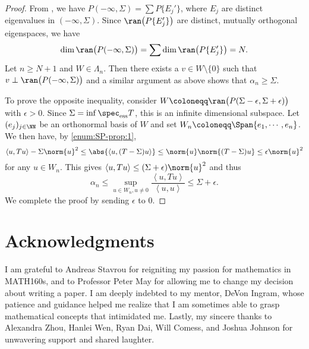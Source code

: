 \documentclass[oneside,reqno,letterpaper]{amsart}
\newcommand{\essspec}{\spec_{\text{ess}}}
\begin{document}
\begin{proof}
  From , we have \(P(-\infty, \Sigma) = \sum P \{E_j'\}\), where \(E_j\) are distinct eigenvalues in \((-\infty, \Sigma)\). 
  Since \(\ran\big(P \{E_j'\} \big)\) are distinct, mutually orthogonal eigenspaces, we have 
  \[
    \dim \ran\big(P(-\infty, \Sigma)\big)
    = \sum \dim \ran\big(P\{E_j'\}\big)
    = N .
  \] 
  Let \(n \geq N + 1\) and \(W \in \Lambda_{n}\). 
  Then there exists a \(v \in W \setminus \{0\}\) such that \(v \perp \ran\big(P(-\infty, \Sigma)\big)\) and a similar argument as above shows that \(\alpha_n \geq \Sigma\). 

  To prove the opposite inequality, consider \(W \coloneqq \ran\big(P(\Sigma - \epsilon, \Sigma + \epsilon)\big)\) with \(\epsilon > 0\). 
  Since \(\Sigma = \inf \essspec T\), this is an infinite dimensional subspace. 
  Let \((e_j)_{j \in \NN}\) be an orthonormal basis of \(W\) and set \(W_n \coloneqq \Span \{e_1, \cdots, e_n\}\).
  We then have, by  \ref{enum:SP-prop:1}, 
  \[
    \left< u, Tu \right> - \Sigma \norm{u}^2  
    \leq \abs{\left< u, (T - \Sigma)u \right>} 
    \leq \norm{u} \norm{(T - \Sigma)u} 
    \leq \epsilon \norm{u}^2 
  \] 
  for any \(u \in W_n\). 
  This gives \(\left< u, Tu \right> \leq (\Sigma + \epsilon) \norm{u}^2 \) and thus
  \[
    \alpha_n \leq \sup_{u \in W_n, u \neq 0} \frac{\left< u, Tu \right>}{\left< u, u \right>} \leq \Sigma + \epsilon . 
  \] 
  We complete the proof by sending \(\epsilon\) to \(0\). 
\end{proof}







\section*{Acknowledgments}
I am grateful to Andreas Stavrou for reigniting my passion for mathematics in MATH160s, and to Professor Peter May for allowing me to change my decision about writing a paper.
I am deeply indebted to my mentor, DeVon Ingram, whose patience and guidance helped me realize that I am sometimes able to grasp mathematical concepts that intimidated me. 
Lastly, my sincere thanks to Alexandra Zhou, Hanlei Wen, Ryan Dai, Will Comess, and Joshua Johnson for unwavering support and shared laughter. 





\printbibliography
\nocite{*}
\end{document}
